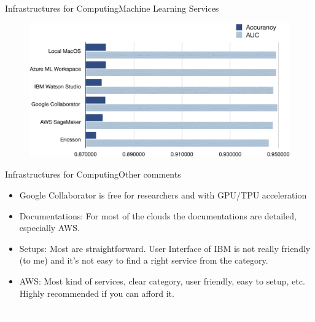 \documentclass{beamer}
\begin{document}
\begin{frame}{Infrastructures for Computing}{Machine Learning Services}
\begin{figure}[h]
	\includegraphics*[height=0.5\linewidth]{AA.png}
\end{figure}
\end{frame}

\begin{frame}{Infrastructures for Computing}{Other comments}
\begin{itemize}
	\item Google Collaborator is free for researchers and with GPU/TPU acceleration
	\item Documentations: For most of the clouds the documentations are detailed, especially AWS.  
	\item Setups: Most are  straightforward. User Interface of IBM is not really friendly (to me) and it's not easy to find a right service from the category.
	\item AWS: Most kind of services, clear category, user friendly, easy to setup, etc. Highly recommended if you can afford it.
\end{itemize}
\end{frame}


\bgroup
{}
\begin{frame}[t,plain]{}{}
  \begin{center}
    {\tiny \textcolor{white}{The End}}
  \end{center}
\end{frame}
\egroup
\end{document}
